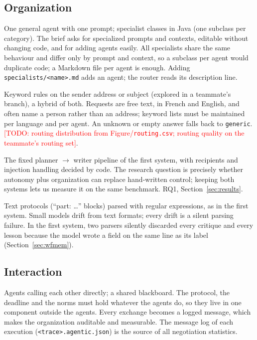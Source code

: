 \documentclass[11pt,a4paper]{article}
\newcommand{\code}[1]{\texttt{#1}}
\newcommand{\todo}[1]{\textcolor{red}{[TODO: #1]}}
\begin{document}
\subsection{Organization}
{One general agent with one prompt; specialist classes in Java (one subclass per category).}
{The brief asks for specialized prompts and contexts, editable without changing code, and for adding agents
easily. All specialists share the same behaviour and differ only by prompt and context, so a subclass per agent
would duplicate code; a Markdown file per agent is enough.}
{Adding \code{specialists/<name>.md} adds an agent; the router reads its description line.}

{Keyword rules on the sender address or subject (explored in a teammate's branch), a hybrid of both.}
{Requests are free text, in French and English, and often name a person rather than an address; keyword lists must
be maintained per language and per agent. An unknown or empty answer falls back to \code{generic}.}
{\todo{routing distribution from Figure/\code{routing.csv}; routing quality on the teammate's routing set}.}

{The fixed planner $\rightarrow$ writer pipeline of the first system, with recipients and injection handling
decided by code.}
{The research question is precisely whether autonomy plus organization can replace hand-written control; keeping
both systems lets us measure it on the same benchmark.}
{RQ1, Section~\ref{sec:results}.}

{Text protocols (``part: \ldots'' blocks) parsed with regular expressions, as in the first system.}
{Small models drift from text formats; every drift is a silent parsing failure.}
{In the first system, two parsers silently discarded every critique and every lesson because the model wrote a
field on the same line as its label (Section~\ref{sec:wfmem}).}

\subsection{Interaction}
{Agents calling each other directly; a shared blackboard.}
{The protocol, the deadline and the norms must hold whatever the agents do, so they live in one component outside
the agents. Every exchange becomes a logged message, which makes the organization auditable and measurable.}
{The message log of each execution (\code{<trace>.agentic.json}) is the source of all negotiation statistics.}
\end{document}
